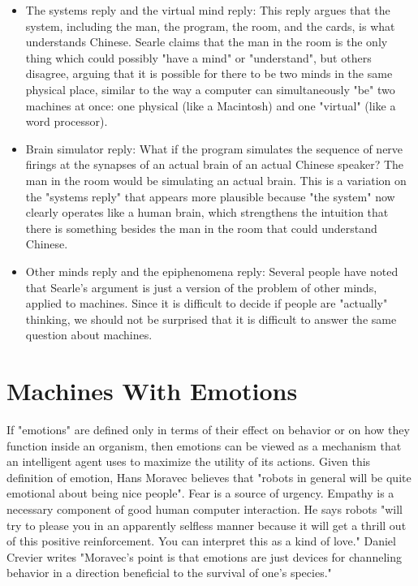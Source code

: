 \documentclass[a4paper,10pt]{article} %
\begin{document}
\begin{itemize}
    \item The systems reply and the virtual mind reply: This reply argues that the system, including the man, the program, the room, and the cards, is what understands Chinese. Searle claims that the man in the room is the only thing which could possibly "have a mind" or "understand", but others disagree, arguing that it is possible for there to be two minds in the same physical place, similar to the way a computer can simultaneously "be" two machines at once: one physical (like a Macintosh) and one "virtual" (like a word processor).
  
    \item Brain simulator reply: What if the program simulates the sequence of nerve firings at the synapses of an actual brain of an actual Chinese speaker? The man in the room would be simulating an actual brain. This is a variation on the "systems reply" that appears more plausible because "the system" now clearly operates like a human brain, which strengthens the intuition that there is something besides the man in the room that could understand Chinese.
    \item Other minds reply and the epiphenomena reply: Several people have noted that Searle's argument is just a version of the problem of other minds, applied to machines. Since it is difficult to decide if people are "actually" thinking, we should not be surprised that it is difficult to answer the same question about machines.
\end{itemize}

 

\section{Machines With Emotions}
If "emotions" are defined only in terms of their effect on behavior or on how they function inside an organism, then emotions can be viewed as a mechanism that an intelligent agent uses to maximize the utility of its actions. Given this definition of emotion, Hans Moravec believes that "robots in general will be quite emotional about being nice people". Fear is a source of urgency. Empathy is a necessary component of good human computer interaction. He says robots "will try to please you in an apparently selfless manner because it will get a thrill out of this positive reinforcement. You can interpret this as a kind of love." Daniel Crevier writes "Moravec's point is that emotions are just devices for channeling behavior in a direction beneficial to the survival of one's species."



\end{document}

